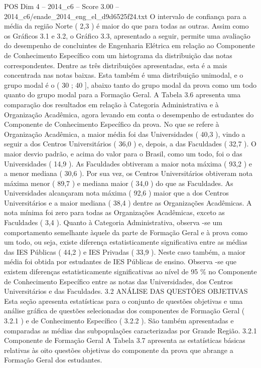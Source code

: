 \begin{textsample}{POS Dim 4 – 2014\_c6 – Score 3.00 – 2014\_c6/enade\_2014\_eng\_el\_d9d6525f24.txt}
O intervalo de confiança para a média da região Norte ( 2,3 ) é maior do que para todas as outras.
Assim como os Gráficos 3.1 e 3.2, o Gráfico 3.3, apresentado a seguir, permite uma avaliação do desempenho de concluintes de Engenharia Elétrica em relação ao Componente de Conhecimento Específico com um histograma da distribuição das notas correspondentes.
Dentre as três distribuições apresentadas, esta é a mais concentrada nas notas baixas.
Esta também é uma distribuição unimodal, e o grupo modal é o ( 30 ; 40 ], abaixo tanto do grupo modal da prova como um todo quanto do grupo modal para a Formação Geral.
A Tabela 3.6 apresenta uma comparação dos resultados em relação à Categoria Administrativa e à Organização Acadêmica, agora levando em conta o desempenho de estudantes do Componente de Conhecimento Específico da prova.
No que se refere à Organização Acadêmica, a maior média foi das Universidades ( 40,3 ), vindo a seguir a dos Centros Universitários ( 36,0 ) e, depois, a das Faculdades ( 32,7 ).
O maior desvio padrão, e acima do valor para o Brasil, como um todo, foi o das Universidades ( 14,9 ).
As Faculdades obtiveram a maior nota máxima ( 93,2 ) e a menor mediana ( 30,6 ).
Por sua vez, os Centros Universitários obtiveram nota máxima menor ( 89,7 ) e mediana maior ( 34,0 ) do que as Faculdades.
As Universidades alcançaram nota máxima ( 92,6 ) maior que a dos Centros Universitários e a maior mediana ( 38,4 ) dentre as Organizações Acadêmicas.
A nota mínima foi zero para todas as Organizações Acadêmicas, exceto as Faculdades ( 3,4 ).
Quanto à Categoria Administrativa, observa -se um comportamento semelhante àquele da parte de Formação Geral e à prova como um todo, ou seja, existe diferença estatisticamente significativa entre as médias das IES Públicas ( 44,2 ) e IES Privadas ( 33,9 ).
Neste caso também, a maior média foi obtida por estudantes de IES Públicas de ensino.
Observa -se que existem diferenças estatisticamente significativas ao nível de 95 \% no Componente de Conhecimento Específico entre as notas das Universidades, dos Centros Universitários e das Faculdades. 3.2 ANÁLISE DAS QUESTÕES OBJETIVAS Esta seção apresenta estatísticas para o conjunto de questões objetivas e uma análise gráfica de questões selecionadas dos componentes de Formação Geral ( 3.2.1 ) e de Conhecimento Específico ( 3.2.2 ).
São também apresentadas e comparadas as médias das subpopulações caracterizadas por Grande Região. 3.2.1 Componente de Formação Geral A Tabela 3.7 apresenta as estatísticas básicas relativas às oito questões objetivas do componente da prova que abrange a Formação Geral dos estudantes.

\end{textsample}
